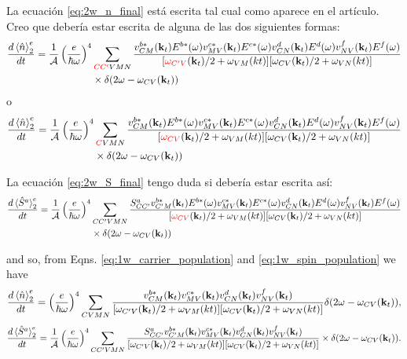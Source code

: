 \documentclass{article}
\newcommand{\kt}{\mathbf{k}_{t}}
\newcommand{\dw}{\delta(2\omega - \omega_{CV}(\kt))}
\begin{document}
{\color{blue} La ecuaci\'on \eqref{eq:2w_n_final} est\'a escrita tal cual
como aparece en el art\'iculo. Creo que deber\'ia estar escrita de alguna de las 
dos siguientes formas:
\begin{equation*}
\begin{split}
\frac{d\ev*{\hat{n}}^{e}_2}{dt} = \frac{1}{\mathcal{A}} \left(\frac{e}{\hbar\omega}\right)^{4} &
\sum_{{\color{red}CC'}VMN} \frac{v^{b*}_{CM}(\kt) E^{b*}(\omega)v^{c*}_{MV}(\kt) E^{c*}(\omega)
v^{d}_{CN}(\kt) E^{d}(\omega)v^{f}_{NV}(\kt) E^{f}(\omega)}
{[{\color{red}\omega_{C'V}}(\kt)/2+\omega_{VM}(kt)][\omega_{CV}(\kt)/2+\omega_{VN}(kt)]} \\
& \times \dw
\end{split}
\end{equation*}
o
\begin{equation*}
\begin{split}
\frac{d\ev*{\hat{n}}^{e}_2}{dt} = \frac{1}{\mathcal{A}} \left(\frac{e}{\hbar\omega}\right)^{4} &
\sum_{{\color{red}C}VMN} \frac{v^{b*}_{CM}(\kt) E^{b*}(\omega)v^{c*}_{MV}(\kt) E^{c*}(\omega)
v^{d}_{CN}(\kt) E^{d}(\omega)v^{f}_{NV}(\kt) E^{f}(\omega)}
{[{\color{red}\omega_{CV}}(\kt)/2+\omega_{VM}(kt)][\omega_{CV}(\kt)/2+\omega_{VN}(kt)]} \\
& \times \dw
\end{split}
\end{equation*}

La ecuaci\'on \eqref{eq:2w_S_final} tengo duda si deber\'ia estar escrita as\'i:
\begin{equation}
\begin{split}
\frac{d\ev*{\hat{S}^{a}}^{e}_2}{dt}= \frac{1}{\mathcal{A}} \left(\frac{e}{\hbar\omega}\right)^{4} &
\sum_{CC'VMN} \frac{S^{a}_{CC'} v^{b*}_{C'M}(\kt) E^{b*}(\omega)v^{c*}_{MV}(\kt) E^{c*}(\omega)
v^{d}_{CN}(\kt) E^{d}(\omega)v^{f}_{NV}(\kt) E^{f}(\omega)}
{[{\color{red}\omega_{CV}}(\kt)/2+\omega_{VM}(kt)][\omega_{CV}(\kt)/2 + \omega_{VN}(kt)]} \\
& \times \dw 
\end{split}
\end{equation}
}

and so, from Eqns. \eqref{eq:1w_carrier_population} and
\eqref{eq:1w_spin_population} we have 
\begin{equation}\label{eq:2_carrier_tensor}
\frac{d\ev*{\hat{n}}^{e}_2}{dt}
= \left(\frac{e}{\hbar\omega}\right)^{4}
\sum_{CVMN} \frac{v^{b*}_{CM}(\kt)v^{c*}_{MV}(\kt)
v^{d}_{CN}(\kt)v^{f}_{NV}(\kt)}
{[\omega_{C'V}(\kt)/2+\omega_{VM}(kt)][\omega_{CV}(\kt)/2+\omega_{VN}(kt)]} 
\dw,
\end{equation}
\begin{equation}\label{eq:2_spin_tensor}
\frac{d\ev*{\hat{S}^{a}}^{e}_2}{dt}= \frac{1}{\mathcal{A}} \left(\frac{e}{\hbar\omega}\right)^{4} 
\sum_{CC'VMN} \frac{S^{a}_{CC'} v^{b*}_{C'M}(\kt)v^{c*}_{MV}(\kt)
v^{d}_{CN}(\kt)v^{f}_{NV}(\kt)}
{[\omega_{C'V}(\kt)/2+\omega_{VM}(kt)][\omega_{CV}(\kt)/2+\omega_{VN}(kt)]} \times \dw.
\end{equation}
\end{document}
